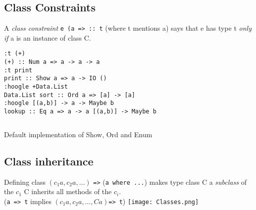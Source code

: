 \documentclass{article}
\newcommand{\Haskell}[1]{\texttt{#1}}
\begin{document}
\subsection{Class Constraints}
A \emph{class constraint} \Haskell{e (a => :: t} (where t mentions a) says that e has type t \emph{only if} a is an instance of class C.\\
\begin{verbatim}
:t (+)
(+) :: Num a => a -> a -> a
:t print
print :: Show a => a -> IO ()
:hoogle +Data.List
Data.List sort :: Ord a => [a] -> [a]
:hoogle [(a,b)] -> a -> Maybe b
lookup :: Eq a => a -> a [(a,b)] -> Maybe b
\end{verbatim}
\begin{listing}[h!]
\inputminted{Haskell}{type-classes.hs}
\caption{Default implementation of Show, Ord and Enum}
\end{listing}
\subsection{Class inheritance}
Defining class $(c_1a,c_2a,\ldots)$ \Haskell{=>} (\Haskell{a where ...}) makes type class C a \emph{subclass} of the $c_1$ C inherits all methods of the $c_i$.\\
(\Haskell{a => t} implies $(c_1a,c_2a,\ldots,Ca)$\Haskell{=> t})
\clearpage
\texttt{[image: Classes.png]}
\newpage
\end{document}
